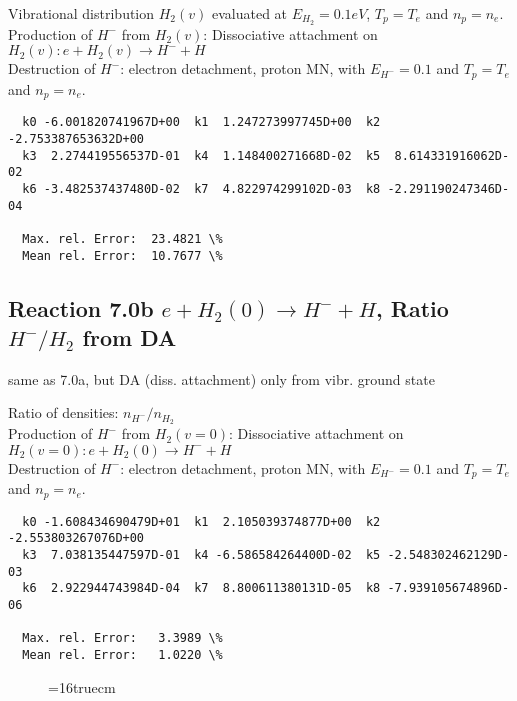 \documentclass[12pt,dvipdfmx]{article}
\begin{document}
{  Vibrational distribution $H_2(v)$ evaluated
  at $E_{H_2} = 0.1 eV$, $T_p = T_e$ and $n_p = n_e$.\\
  Production of $H^-$ from $H_2(v)$:  Dissociative attachment on $H_2(v):  e+H_2(v) \rightarrow H^- + H$  \\
  Destruction of $H^-$: electron detachment, proton MN, with $E_{H^-}=0.1$ and $T_p = T_e$ and $n_p = n_e$.

\begin{small}\begin{verbatim}
  k0 -6.001820741967D+00  k1  1.247273997745D+00  k2 -2.753387653632D+00
  k3  2.274419556537D-01  k4  1.148400271668D-02  k5  8.614331916062D-02
  k6 -3.482537437480D-02  k7  4.822974299102D-03  k8 -2.291190247346D-04

  Max. rel. Error:  23.4821 \%
  Mean rel. Error:  10.7677 \%
\end{verbatim}\end{small}

\subsection{
Reaction 7.0b      $ e + H_2(0) \rightarrow H^- + H$, Ratio \ $H^-/H_2$ from DA
}


 same as 7.0a, but DA (diss. attachment) only from vibr. ground state

  Ratio of densities: $n_{H^-}/n_{H_2}$\\
  Production of $H^-$ from $H_2(v=0)$: Dissociative attachment on $H_2(v=0):  e+H_2(0) \rightarrow H^- + H$    \\
  Destruction of $H^-$: electron detachment, proton MN, with $E_{H^-}=0.1$ and $T_p = T_e$ and $n_p = n_e$.

\begin{small}\begin{verbatim}
  k0 -1.608434690479D+01  k1  2.105039374877D+00  k2 -2.553803267076D+00
  k3  7.038135447597D-01  k4 -6.586584264400D-02  k5 -2.548302462129D-03
  k6  2.922944743984D-04  k7  8.800611380131D-05  k8 -7.939105674896D-06

  Max. rel. Error:   3.3989 \%
  Mean rel. Error:   1.0220 \%
\end{verbatim}\end{small}


\begin{figure} \label{7.0}
\epsfxsize=16truecm
\end{figure}

}
\end{document}
